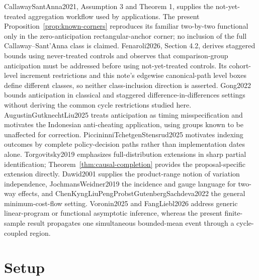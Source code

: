 \documentclass{article}
\begin{document}
CallawaySantAnna2021, Assumption 3 and Theorem 1, supplies the not-yet-treated aggregation workflow used by applications. The present Proposition~\ref{prop:known-corners} reproduces its familiar two-by-two functional only in the zero-anticipation rectangular-anchor corner; no inclusion of the full Callaway--Sant'Anna class is claimed. Fenaroli2026, Section 4.2, derives staggered bounds using never-treated controls and observes that comparison-group anticipation must be addressed before using not-yet-treated controls. Its cohort-level increment restrictions and this note's edgewise canonical-path level boxes define different classes, so neither class-inclusion direction is asserted. Gong2022 bounds anticipation in classical and staggered difference-in-differences settings without deriving the common cycle restrictions studied here. AugustinGutknechtLiu2025 treats anticipation as timing misspecification and motivates the Indonesian anti-cheating application, using groups known to be unaffected for correction. PiccininniTchetgenStensrud2025 motivates indexing outcomes by complete policy-decision paths rather than implementation dates alone. Torgovitsky2019 emphasizes full-distribution extensions in sharp partial identification; Theorem~\ref{thm:causal-completion} provides the proposal-specific extension directly. Dawid2001 supplies the product-range notion of variation independence, JochmansWeidner2019 the incidence and gauge language for two-way effects, and ChenKyngLiuPengProbstGutenbergSachdeva2022 the general minimum-cost-flow setting. Voronin2025 and FangLiebl2026 address generic linear-program or functional asymptotic inference, whereas the present finite-sample result propagates one simultaneous bounded-mean event through a cycle-coupled region.

\section{Setup}
\end{document}
